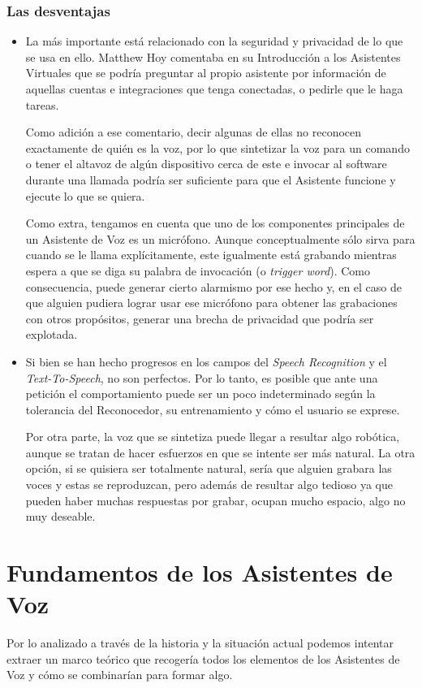 \subsubsection{Las desventajas}
	\begin{itemize}
		\item La más importante está relacionado con la seguridad y privacidad de lo que se usa en ello. Matthew Hoy \cite{vaintroduction-matthewhoy} comentaba en su Introducción a los Asistentes Virtuales que se podría preguntar al propio asistente por información de aquellas cuentas e integraciones que tenga conectadas, o pedirle que le haga tareas.
		
		Como adición a ese comentario, decir algunas de ellas no reconocen exactamente de quién es la voz, por lo que sintetizar la voz para un comando o tener el altavoz de algún dispositivo cerca de este e invocar al software durante una llamada podría ser suficiente para que el Asistente funcione y ejecute lo que se quiera.
		
		Como extra, tengamos en cuenta que uno de los componentes principales de un Asistente de Voz es un micrófono. Aunque conceptualmente sólo sirva para cuando se le llama explícitamente, este igualmente está grabando mientras espera a que se diga su palabra de invocación (o \textit{trigger word}). Como consecuencia, puede generar cierto alarmismo por ese hecho y, en el caso de que alguien pudiera lograr usar ese micrófono para obtener las grabaciones con otros propósitos, generar una brecha de privacidad que podría ser explotada.
		
		\item Si bien se han hecho progresos en los campos del \textit{Speech Recognition} y el \textit{Text-To-Speech}, no son perfectos. Por lo tanto, es posible que ante una petición el comportamiento puede ser un poco indeterminado según la tolerancia del Reconocedor, su entrenamiento y cómo el usuario se exprese.
		
		Por otra parte, la voz que se sintetiza puede llegar a resultar algo robótica, aunque se tratan de hacer esfuerzos en que se intente ser más natural. La otra opción, si se quisiera ser totalmente natural, sería que alguien grabara las voces y estas se reproduzcan, pero además de resultar algo tedioso ya que pueden haber muchas respuestas por grabar, ocupan mucho espacio, algo no muy deseable.
	\end{itemize}

\section{Fundamentos de los Asistentes de Voz}
Por lo analizado a través de la historia y la situación actual podemos intentar extraer un marco teórico que recogería todos los elementos de los Asistentes de Voz y cómo se combinarían para formar algo.


